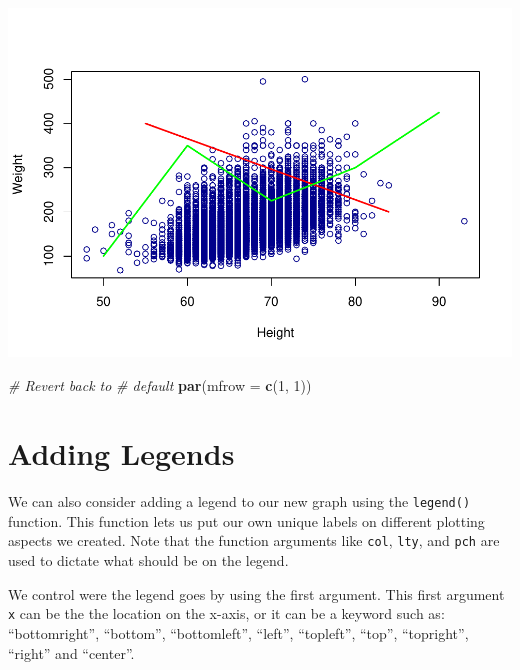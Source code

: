 \documentclass[
]{book}
\newenvironment{Shaded}{\begin{snugshade}}{\end{snugshade}}
\newcommand{\CommentTok}[1]{\textcolor[rgb]{0.56,0.35,0.01}{\textit{#1}}}
\newcommand{\DataTypeTok}[1]{\textcolor[rgb]{0.13,0.29,0.53}{#1}}
\newcommand{\DecValTok}[1]{\textcolor[rgb]{0.00,0.00,0.81}{#1}}
\newcommand{\KeywordTok}[1]{\textcolor[rgb]{0.13,0.29,0.53}{\textbf{#1}}}
\newcommand{\NormalTok}[1]{#1}
\begin{document}
\includegraphics{_main_files/figure-latex/unnamed-chunk-188-1.pdf}

\begin{Shaded}
\begin{Highlighting}[]
\CommentTok{# Revert back to}
\CommentTok{# default}
\KeywordTok{par}\NormalTok{(}\DataTypeTok{mfrow =} \KeywordTok{c}\NormalTok{(}\DecValTok{1}\NormalTok{, }\DecValTok{1}\NormalTok{))}
\end{Highlighting}
\end{Shaded}

\hypertarget{adding-legends}{%
\section{Adding Legends}\label{adding-legends}}

We can also consider adding a legend to our new graph using the \texttt{legend()} function. This function lets us put our own unique labels on different plotting aspects we created. Note that the function arguments like \texttt{col}, \texttt{lty}, and \texttt{pch} are used to dictate what should be on the legend.

We control were the legend goes by using the first argument. This first argument \texttt{x} can be the the location on the x-axis, or it can be a keyword such as: ``bottomright'', ``bottom'', ``bottomleft'', ``left'', ``topleft'', ``top'', ``topright'', ``right'' and ``center''.
\end{document}
